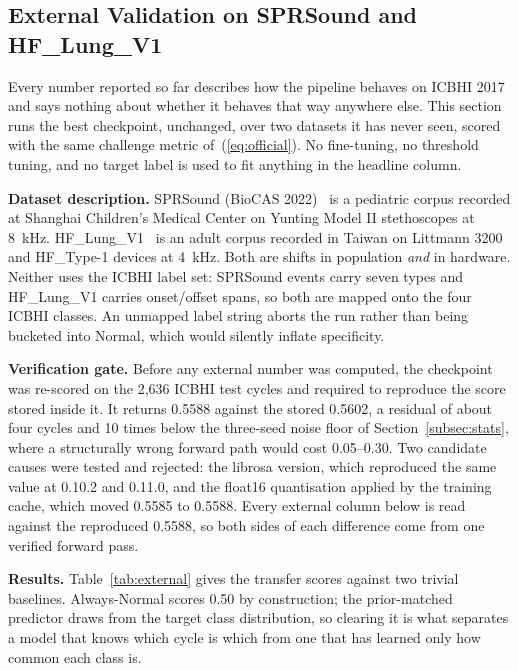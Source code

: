\documentclass[journal,onecolumn]{IEEEtran}
\newif\ifshownew
\newcommand{\added}[1]{\ifshownew\ul{#1}\else#1\fi}
\newenvironment{addedblock}{}{}
\begin{document}
\begin{addedblock}
\subsection{External Validation on SPRSound and HF\_Lung\_V1}
\label{subsec:external}

\added{%
Every number reported so far describes how the pipeline behaves on ICBHI 2017 and says nothing
about whether it behaves that way anywhere else. This section runs the best checkpoint,
unchanged, over two datasets it has never seen, scored with the same challenge metric
of~(\mbox{\ref{eq:official}}). No fine-tuning, no threshold tuning, and no target label is used to fit
anything in the headline column.%
}

\added{%
\textbf{Dataset description.} SPRSound (BioCAS 2022)~\mbox{\cite{zhang2022sprsound}} is a pediatric
corpus recorded at Shanghai Children's Medical Center on Yunting Model II stethoscopes at
8~kHz. HF\_Lung\_V1~\mbox{\cite{hsu2021hflung}} is an adult corpus recorded in Taiwan on Littmann 3200
and HF\_Type-1 devices at 4~kHz. Both are shifts in population \emph{and} in hardware. Neither
uses the ICBHI label set: SPRSound events carry seven types and HF\_Lung\_V1 carries
onset/offset spans, so both are mapped onto the four ICBHI classes. An unmapped label string
aborts the run rather than being bucketed into Normal, which would silently inflate
specificity.%
}

\added{%
\textbf{Verification gate.} Before any external number was computed, the checkpoint was
re-scored on the 2,636 ICBHI test cycles and required to reproduce the score stored inside it.
It returns 0.5588 against the stored 0.5602, a residual of about four cycles and 10 times below
the three-seed noise floor of Section~\mbox{\ref{subsec:stats}}, where a structurally wrong forward
path would cost 0.05--0.30. Two candidate causes were tested and rejected: the librosa version,
which reproduced the same value at 0.10.2 and 0.11.0, and the float16 quantisation applied by
the training cache, which moved 0.5585 to 0.5588. Every external column below is read against
the reproduced 0.5588, so both sides of each difference come from one verified forward pass.%
}

\added{%
\textbf{Results.} Table~\mbox{\ref{tab:external}} gives the transfer scores against two trivial
baselines. Always-Normal scores 0.50 by construction; the prior-matched predictor draws from
the target class distribution, so clearing it is what separates a model that knows which cycle
is which from one that has learned only how common each class is.%
}


\end{addedblock}
\end{document}
